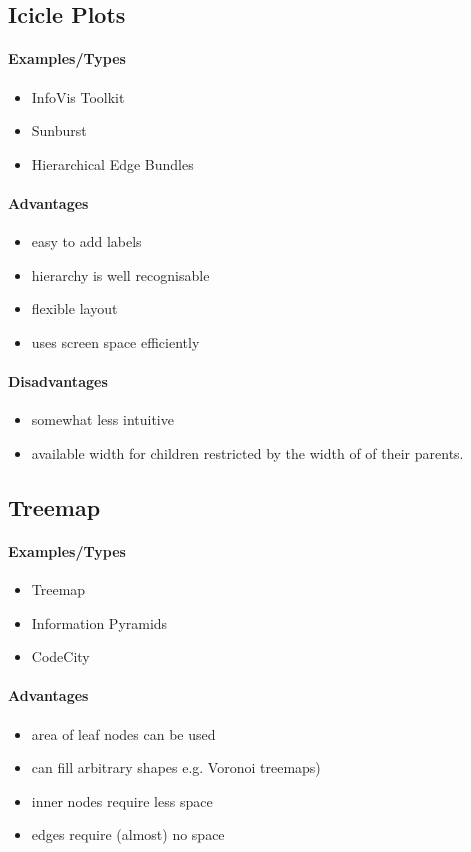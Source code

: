 \documentclass[10pt,a4paper]{article}
\begin{document}
	\subsection{Icicle Plots}
	\paragraph{Examples/Types}
	\begin{itemize}
		\item InfoVis Toolkit
		\item Sunburst
		\item Hierarchical Edge Bundles
	\end{itemize}
	\paragraph{Advantages}
	\begin{itemize}
		\item easy to add labels
		\item hierarchy is well	recognisable
		\item flexible layout
		\item uses screen space efficiently
	\end{itemize}
	\paragraph{Disadvantages}
	\begin{itemize}
		\item somewhat less intuitive
		\item available width for children restricted by the width of of their parents.
	\end{itemize}

	\subsection{Treemap}
	\paragraph{Examples/Types}
	\begin{itemize}
		\item Treemap
		\item Information Pyramids
		\item CodeCity
	\end{itemize}
	\paragraph{Advantages}
	\begin{itemize}
		\item area of leaf nodes can be used
		\item can fill arbitrary shapes e.g. Voronoi treemaps)
		\item inner nodes require less space
		\item edges require (almost) no space
	\end{itemize}
\end{document}
